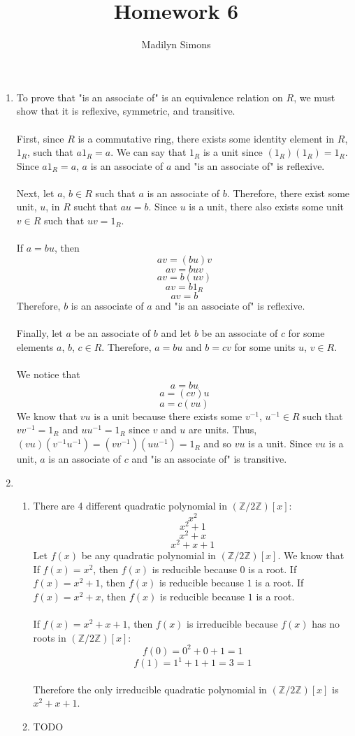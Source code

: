 \documentclass{article}
\title{Homework 6}
\author{Madilyn Simons}
\date{}
\newcommand{\Z}{\mathbb{Z}}
\begin{document}
\maketitle

\begin{enumerate}

\item To prove that "is an associate of" is an equivalence relation on $R$, we
must show that it is reflexive, symmetric, and transitive.
\\
\\
First, since $R$ is a commutative ring, there exists some identity element in
$R$, $1_R$, such that $a1_R = a$.  We can say that $1_R$ is a unit since
$(1_{R})  (1_{R}) = 1_{R}$.  Since $a1_R = a$, $a$ is an associate of $a$
and "is an associate of" is reflexive.
\\
\\
Next, let $a$, $b \in R$ such that $a$ is an associate of $b$.  Therefore,
there exist some unit, $u$, in $R$ sucht that $au = b$.  Since $u$ is a unit,
there also exists some unit $v \in R$ such that $uv = 1_R$.
\\
\\
If $a = bu$, then
\[
av = (bu)v
\] \[
av = buv
\] \[
av = b(uv)
\] \[
av = b1_{R}
\] \[
av = b
\]
Therefore, $b$ is an associate of $a$ and "is an associate of" is reflexive.
\\
\\
Finally, let $a$ be an associate of $b$ and let $b$ be an associate of $c$ for
some elements $a$, $b$, $c \in R$.  Therefore, $a = bu$ and $b = cv$ for some
units $u$, $v \in R$.
\\
\\
We notice that
\[
a = bu
\] \[
a = (cv)u
\] \[
a = c(vu)
\]
We know that $vu$ is a unit because there exists some
$v^{-1}$, $u^{-1} \in R$ such that $vv^{-1} = 1_R$ and $uu^{-1} = 1_R$ since
$v$ and $u$ are units.  Thus, $(vu)(v^{-1}u^{-1}) = (vv^{-1})(uu^{-1}) = 1_R$
and so $vu$ is a unit.  Since $vu$ is a unit, $a$ is an associate of $c$ and
"is an associate of" is transitive.

\item
\begin{enumerate}
\item There are 4 different quadratic polynomial in $(\Z/2\Z)[x]$:
\[
x^2
\] \[
x^2 + 1
\] \[
x^2 + x
\] \[
x^2 + x + 1
\]
Let $f(x)$ be any quadratic polynomial in $(\Z/2\Z)[x]$.  We know that
If $f(x) = x^2$, then $f(x)$ is reducible because $0$ is a root.
If $f(x) = x^2 + 1$, then $f(x)$ is reducible because $1$ is a root.
If $f(x) = x^2 + x$, then $f(x)$ is reducible because $1$ is a root.
\\ \\
If $f(x) = x^2 + x + 1$, then $f(x)$ is irreducible because $f(x)$ has no roots
in $(\Z/2\Z)[x]$:
\[
f(0) = 0^2 + 0 + 1 = 1
\] \[
f(1) = 1^1 + 1 + 1 = 3 = 1
\]
\\
Therefore the only irreducible quadratic polynomial in $(\Z/2\Z)[x]$ is
$x^2 + x + 1$.

\item TODO
\end{enumerate}

\end{enumerate}
\end{document}
